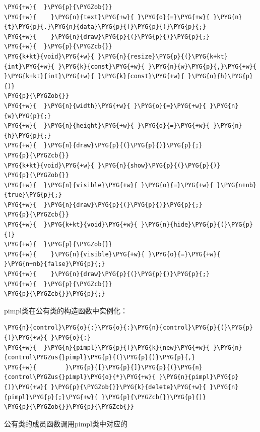 \begin{codeblockbg}
\begin{Verbatim}[commandchars=\\\{\},breaklines=true,breakanywhere=true,fontsize=\codefont,xleftmargin=17bp]
\PYG{+w}{  }\PYG{p}{\PYGZob{}}
\PYG{+w}{    }\PYG{n}{text}\PYG{+w}{ }\PYG{o}{=}\PYG{+w}{ }\PYG{n}{t}\PYG{p}{.}\PYG{n}{data}\PYG{p}{(}\PYG{p}{)}\PYG{p}{;}
\PYG{+w}{    }\PYG{n}{draw}\PYG{p}{(}\PYG{p}{)}\PYG{p}{;}
\PYG{+w}{  }\PYG{p}{\PYGZcb{}}
\PYG{k+kt}{void}\PYG{+w}{ }\PYG{n}{resize}\PYG{p}{(}\PYG{k+kt}{int}\PYG{+w}{ }\PYG{k}{const}\PYG{+w}{ }\PYG{n}{w}\PYG{p}{,}\PYG{+w}{ }\PYG{k+kt}{int}\PYG{+w}{ }\PYG{k}{const}\PYG{+w}{ }\PYG{n}{h}\PYG{p}{)}
\PYG{p}{\PYGZob{}}
\PYG{+w}{  }\PYG{n}{width}\PYG{+w}{ }\PYG{o}{=}\PYG{+w}{ }\PYG{n}{w}\PYG{p}{;}
\PYG{+w}{  }\PYG{n}{height}\PYG{+w}{ }\PYG{o}{=}\PYG{+w}{ }\PYG{n}{h}\PYG{p}{;}
\PYG{+w}{  }\PYG{n}{draw}\PYG{p}{(}\PYG{p}{)}\PYG{p}{;}
\PYG{p}{\PYGZcb{}}
\PYG{k+kt}{void}\PYG{+w}{ }\PYG{n}{show}\PYG{p}{(}\PYG{p}{)}
\PYG{p}{\PYGZob{}}
\PYG{+w}{  }\PYG{n}{visible}\PYG{+w}{ }\PYG{o}{=}\PYG{+w}{ }\PYG{n+nb}{true}\PYG{p}{;}
\PYG{+w}{  }\PYG{n}{draw}\PYG{p}{(}\PYG{p}{)}\PYG{p}{;}
\PYG{p}{\PYGZcb{}}
\PYG{+w}{  }\PYG{k+kt}{void}\PYG{+w}{ }\PYG{n}{hide}\PYG{p}{(}\PYG{p}{)}
\PYG{+w}{  }\PYG{p}{\PYGZob{}}
\PYG{+w}{    }\PYG{n}{visible}\PYG{+w}{ }\PYG{o}{=}\PYG{+w}{ }\PYG{n+nb}{false}\PYG{p}{;}
\PYG{+w}{    }\PYG{n}{draw}\PYG{p}{(}\PYG{p}{)}\PYG{p}{;}
\PYG{+w}{  }\PYG{p}{\PYGZcb{}}
\PYG{p}{\PYGZcb{}}\PYG{p}{;}
\end{Verbatim}
\end{codeblockbg}



pimpl类在公有类的构造函数中实例化：



\begin{codeblockbg}
\begin{Verbatim}[commandchars=\\\{\},breaklines=true,breakanywhere=true,fontsize=\codefont,xleftmargin=17bp]
\PYG{n}{control}\PYG{o}{:}\PYG{o}{:}\PYG{n}{control}\PYG{p}{(}\PYG{p}{)}\PYG{+w}{ }\PYG{o}{:}
\PYG{+w}{  }\PYG{n}{pimpl}\PYG{p}{(}\PYG{k}{new}\PYG{+w}{ }\PYG{n}{control\PYGZus{}pimpl}\PYG{p}{(}\PYG{p}{)}\PYG{p}{,}
\PYG{+w}{        }\PYG{p}{[}\PYG{p}{]}\PYG{p}{(}\PYG{n}{control\PYGZus{}pimpl}\PYG{o}{*}\PYG{+w}{ }\PYG{n}{pimpl}\PYG{p}{)}\PYG{+w}{ }\PYG{p}{\PYGZob{}}\PYG{k}{delete}\PYG{+w}{ }\PYG{n}{pimpl}\PYG{p}{;}\PYG{+w}{ }\PYG{p}{\PYGZcb{}}\PYG{p}{)}
\PYG{p}{\PYGZob{}}\PYG{p}{\PYGZcb{}}
\end{Verbatim}
\end{codeblockbg}



公有类的成员函数调用pimpl类中对应的


